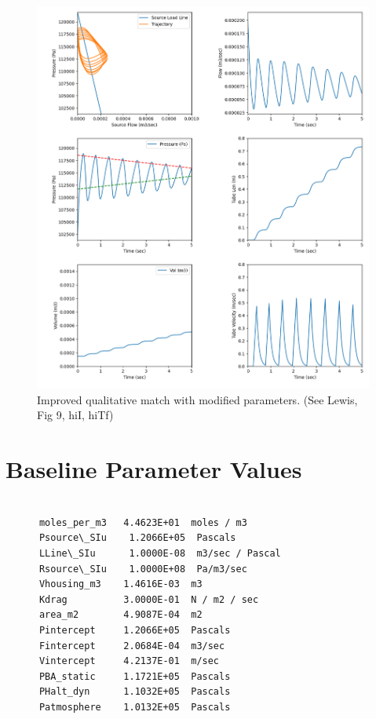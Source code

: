\documentclass[letterpaper]{article}
\begin{document}
\begin{figure}\centering
\includegraphics[width=.75\textwidth]{Figure_9HhiI_hiTf_tweakedParams.png}
\caption{Improved qualitative match with modified parameters.  (See Lewis, Fig 9, hiI, hiTf)}
\label{Fig:ModifParResults}
\end{figure}

\clearpage

\section{Baseline Parameter Values}\label{baselineParms}
\begin{verbatim}

      moles_per_m3   4.4623E+01  moles / m3
      Psource\_SIu    1.2066E+05  Pascals
      LLine\_SIu      1.0000E-08  m3/sec / Pascal
      Rsource\_SIu    1.0000E+08  Pa/m3/sec
      Vhousing_m3    1.4616E-03  m3
      Kdrag          3.0000E-01  N / m2 / sec
      area_m2        4.9087E-04  m2
      Pintercept     1.2066E+05  Pascals
      Fintercept     2.0684E-04  m3/sec
      Vintercept     4.2137E-01  m/sec
      PBA_static     1.1721E+05  Pascals
      PHalt_dyn      1.1032E+05  Pascals
      Patmosphere    1.0132E+05  Pascals

\end{verbatim}
\end{document}
